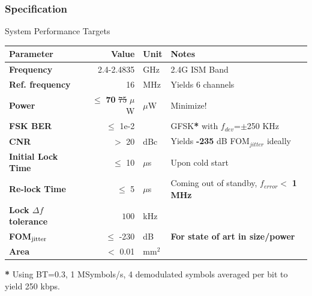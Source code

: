 \documentclass[t, screen, aspectratio=43]{beamer}
\begin{document}
\begin{frame}
	\frametitle{Specification\color{black}}
	\begin{block}{System Performance Targets}
		\tiny
		\begin{table}[h!]
			\centering
			\def\arraystretch{1.5}		
			\setlength\arrayrulewidth{0.75pt}
			\setlength{\tabcolsep}{1em} %
			\begin{tabular}{|l|r|l|l|}
				\hline 
				\rule[-1ex]{0pt}{2.5ex} \cellcolor{gray!40}\textbf{Parameter} & \cellcolor{gray!40}\textbf{Value} & \cellcolor{gray!40}\textbf{Unit }& \cellcolor{gray!40}\textbf{Notes}\\ 
				\hline 
				\rule[-1ex]{0pt}{2.5ex} \textbf{Frequency}  & 2.4-2.4835 & GHz & 2.4G ISM Band\\ 
				\hline 
				\rule[-1ex]{0pt}{2.5ex} \textbf{Ref. frequency} & 16 & MHz & Yields 6 channels \\ 
				\hline 
				\rule[-1ex]{0pt}{2.5ex} \textbf{Power} & $\leq$ \textbf{70} {\color{red}\st{75}} $\mu$W  &$\mu$W & Minimize!\\ 
				\hline 
				\rule[-1ex]{0pt}{2.5ex} \textbf{FSK BER} & $\leq$ 1e-2  & & GFSK\textbf{*} with $f_{dev}$=$\pm$250 KHz\\ 
				\hline 
				\rule[-1ex]{0pt}{2.5ex} \textbf{CNR} & $>$ 20 & dBc&Yields  \textbf{-235} dB FOM$_{jitter}$ ideally \\ 
				\hline 
				\rule[-1ex]{0pt}{2.5ex} \textbf{Initial Lock Time} & $\leq$ 10 & $\mu$s & Upon cold start \\ 
				\hline 
				\rule[-1ex]{0pt}{2.5ex} \textbf{Re-lock Time} & $\leq$ 5 & $\mu$s & Coming out of standby, $f_{error} <$ \textbf{1 MHz} \\ 
				\hline 
				\rule[-1ex]{0pt}{2.5ex} \textbf{Lock $\Delta f$ tolerance} & $100$ & kHz& \\ 
				\hline 
				\rule[-1ex]{0pt}{2.5ex} \textbf{FOM}$_{\textnormal{jitter}}$ & $\leq$ -230 & dB & \textbf{For state of art in size/power} \\ 
				\hline 
				\rule[-1ex]{0pt}{2.5ex} \textbf{Area} & $<$ 0.01  & mm$^2$ & \\ 
				\hline 
			\end{tabular} 
		\end{table}   
		\textbf{*} Using BT=0.3, 1 MSymbols/s, 4 demodulated symbols averaged per bit to yield 250 kbps.
	\end{block}    
\end{frame}
\end{document}
